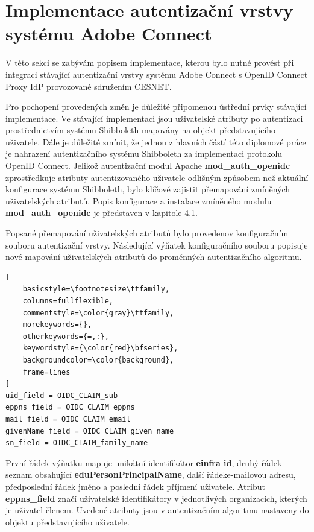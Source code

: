 \documentclass[
  printed, %
  twoside, %
  table,   %
  nolof,     %
  nolot,     %
]{fithesis3}
\begin{document}
\section{Implementace autentizační vrstvy systému Adobe Connect}
\label{ACImpl}
V této sekci se zabývám popisem implementace, kterou bylo nutné provést při integraci stávající autentizační vrstvy systému Adobe Connect s OpenID Connect Proxy IdP provozované sdružením CESNET. 
\par 
Pro pochopení provedených změn je důležité připomenou ústřední prvky stávající implementace. Ve stávající implementaci jsou uživatelské atributy po autentizaci prostřednictvím systému Shibboleth mapovány na objekt představujícího uživatele. Dále je důležité zmínit, že jednou z hlavních částí této diplomové práce je nahrazení autentizačního systému Shibboleth za implementaci protokolu OpenID Connect. Jelikož autentizační modul Apache \textbf{mod\_auth\_openidc} zprostředkuje atributy autentizovaného uživatele odlišným způsobem než aktuální konfigurace systému Shibboleth, bylo klíčové zajistit přemapování zmíněných uživatelských atributů. Popis konfigurace a instalace zmíněného modulu \textbf{mod\_auth\_openidc} je představen v kapitole \hyperref[apacheInstall]{4.1}.  
\par

Popsané přemapování uživatelských atributů bylo provedeno\break v konfiguračním souboru  autentizační vrstvy. Následující výňatek konfiguračního souboru popisuje nové mapování uživatelských atributů do proměnných autentizačního algoritmu. 

\begin{lstlisting}[
    basicstyle=\footnotesize\ttfamily,
    columns=fullflexible,
    commentstyle=\color{gray}\ttfamily,
    morekeywords={},
    otherkeywords={=,:},
    keywordstyle={\color{red}\bfseries},
    backgroundcolor=\color{background},
    frame=lines
]
uid_field = OIDC_CLAIM_sub
eppns_field = OIDC_CLAIM_eppns
mail_field = OIDC_CLAIM_email
givenName_field = OIDC_CLAIM_given_name
sn_field = OIDC_CLAIM_family_name
\end{lstlisting}
První řádek výňatku mapuje unikátní identifikátor \textbf{einfra id}, druhý řádek seznam obsahující \textbf{eduPersonPrincipalName}, další řádek\break e-mailovou adresu, předposlední řádek jméno a poslední řádek příjmení uživatele. Atribut \textbf{eppns\_field} značí uživatelské identifikátory v jednotlivých organizacích, kterých je uživatel členem. Uvedené atributy jsou v autentizačním algoritmu nastaveny do objektu představujícího uživatele. 
\par 
\end{document}
